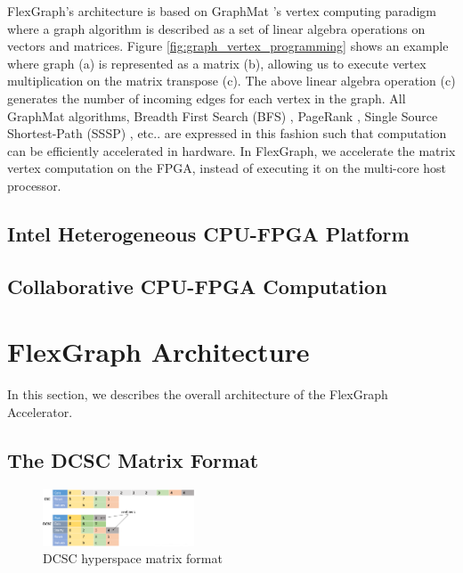 FlexGraph's architecture is based on GraphMat \cite{GraphMat}'s vertex computing paradigm where a graph algorithm is described as a set of linear algebra operations on vectors and matrices. Figure \ref{fig:graph_vertex_programming} shows an example where graph (a) is represented as a matrix (b), allowing us to execute vertex multiplication on the matrix transpose (c). The above linear algebra operation (c) generates the number of incoming edges for each vertex in the graph. All GraphMat algorithms, Breadth First Search (BFS) \cite{BFS}, PageRank \cite{PageRank}, Single Source Shortest-Path (SSSP) \cite{SSSP}, etc.. are expressed in this fashion such that computation can be efficiently accelerated in hardware. In FlexGraph, we accelerate the matrix vertex computation on the FPGA, instead of executing it on the multi-core host processor.

\subsection{Intel Heterogeneous CPU-FPGA Platform}

\subsection{Collaborative CPU-FPGA Computation}

\section{FlexGraph Architecture}

In this section, we describes the overall architecture of the FlexGraph Accelerator.

\subsection{The DCSC Matrix Format}

\begin{figure}[htbp]
\centering
\includegraphics[width=0.4\textwidth]{figures/DCSC_matrix_format}
\caption{DCSC hyperspace matrix format}
\label{fig:DCSC_matrix_format}
\end{figure}


